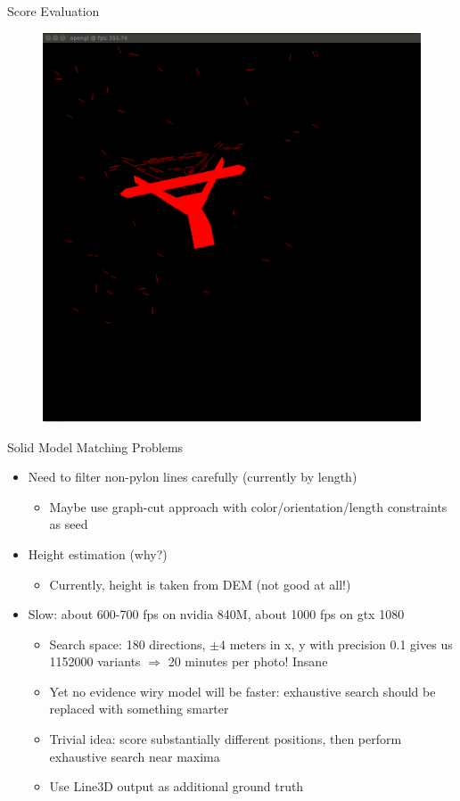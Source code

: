 \documentclass{beamer}
\begin{document}
\begin{frame}[t, fragile]{Score Evaluation}
\begin{figure}
\centering
\includegraphics[scale=0.18]{render}
\end{figure}
\end{frame}

\begin{frame}[t, fragile]{Solid Model Matching Problems}
\begin{itemize}
\item Need to filter non-pylon lines carefully (currently by length)
\begin{itemize}
\item Maybe use graph-cut approach with color/orientation/length constraints as seed
\end{itemize}
\item Height estimation (why?)
\begin{itemize}
\item Currently, height is taken from DEM (not good at all!)
\end{itemize}
\item Slow: about 600-700 fps on nvidia 840M, about 1000 fps on gtx 1080
\begin{itemize}
\item Search space: 180 directions, $\pm 4$ meters in x, y with precision 0.1 gives us 1152000 variants $\Rightarrow$ 20 minutes per photo! Insane
\item Yet no evidence wiry model will be faster: exhaustive search should be replaced with something smarter
\item Trivial idea: score substantially different positions, then perform exhaustive search near maxima
\item Use Line3D output as additional ground truth
\end{itemize}
\end{itemize}
\end{frame}
\end{document}
